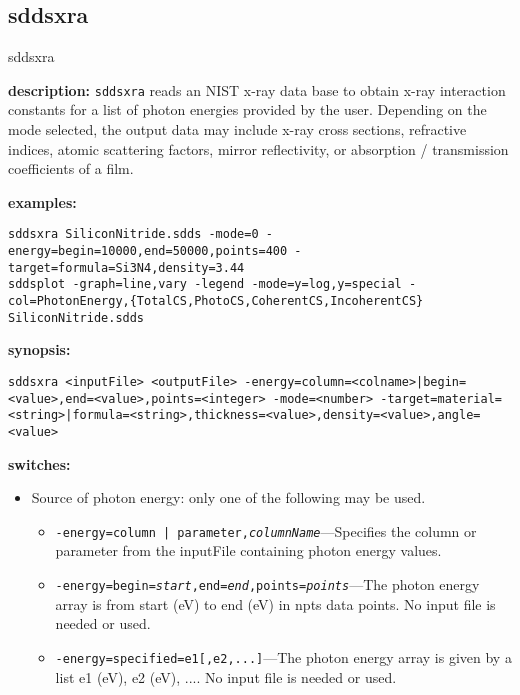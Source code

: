 \newpage
\subsection{sddsxra}
\label{sddsxra}

\begin{sddsprog}{sddsxra}
\item \textbf{description:}
\verb|sddsxra| reads an NIST x-ray data base to obtain x-ray interaction constants for a list of photon energies provided by the user. Depending on the mode selected, the output data may include x-ray cross sections, refractive indices, atomic scattering factors, mirror reflectivity, or absorption / transmission coefficients of a film.
\item \textbf{examples:}
\begin{verbatim}
sddsxra SiliconNitride.sdds -mode=0 -energy=begin=10000,end=50000,points=400 -target=formula=Si3N4,density=3.44
sddsplot -graph=line,vary -legend -mode=y=log,y=special -col=PhotonEnergy,{TotalCS,PhotoCS,CoherentCS,IncoherentCS} SiliconNitride.sdds
\end{verbatim}
\item \textbf{synopsis:}
\begin{verbatim}
sddsxra <inputFile> <outputFile> -energy=column=<colname>|begin=<value>,end=<value>,points=<integer> -mode=<number> -target=material=<string>|formula=<string>,thickness=<value>,density=<value>,angle=<value>
\end{verbatim}
\item \textbf{switches:}
  \begin{itemize}
  \item Source of photon energy: only one of the following may be used.
    \begin{itemize}
      \item {\tt -energy={column | parameter},{\em columnName}}---Specifies the column or parameter from the inputFile containing photon energy values.
      \item {\tt -energy=begin={\em start},end={\em end},points={\em points}}---The photon energy array is from start (eV) to end (eV) in npts data points. No input file is needed or used.
      \item {\tt -energy=specified={e1[,e2,...]}}---The photon energy array is given by a list e1 (eV), e2 (eV), .... No input file is needed or used.
    \end{itemize}

\end{itemize}
\end{sddsprog}

